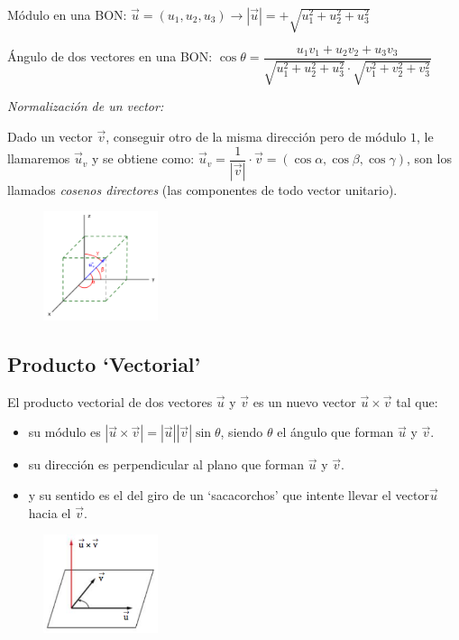 \vspace{2mm} Módulo en una BON: $ \vec u=(u_1,u_2,u_3) \to |\vec u|=+\sqrt{u_1^2+u_2^2+u_3^2}$
		
\vspace{2mm} Ángulo \small{de dos vectores en una BON:} $\cos \theta = \dfrac {u_1 v_1+u_2 v_2+u_3 v_3}{\sqrt{u_1^2+u_2^2+u_3^2}\cdot \sqrt{v_1^2+v_2^2+v_3^2}}$

\vspace{4mm}

\begin{multicols}{2}
\textit{Normalización de un vector:} 

Dado un vector $\vec v$, conseguir otro de la misma dirección pero de módulo $1$, le llamaremos $\vec u_v$ y se obtiene como: $\vec u_v=\dfrac {1}{|\vec v|}\cdot \vec v = (\cos \alpha, \cos \beta, \cos \gamma)$, son los llamados \textit{cosenos directores} (las componentes de todo vector unitario).
\begin{figure}[H]
	\centering
	\includegraphics[width=0.30\textwidth]{imagenes/imagenes10/T10IM08.png}
\end{figure}
\end{multicols}

\subsection{Producto `Vectorial'}

El producto vectorial de dos vectores $\vec u$ y $\vec v$ es un nuevo vector $\vec u \times \vec v$	 tal que:
\begin{multicols}{2}
\begin{itemize}
\item su módulo es $|\vec u \times \vec v|=|\vec u||\vec v| \sin \theta $, siendo $\theta$ el ángulo que forman $\vec u$ y $\vec v$.
\item su dirección es perpendicular al plano que forman $\vec u$ y $\vec v$.
\item y su sentido es el del giro de un `sacacorchos' que intente llevar el vector$\vec u$ hacia el $\vec v$.
\end{itemize}
\begin{figure}[H]
	\centering
	\includegraphics[width=0.30\textwidth]{imagenes/imagenes10/T10IM09.png}
\end{figure}
\end{multicols}

